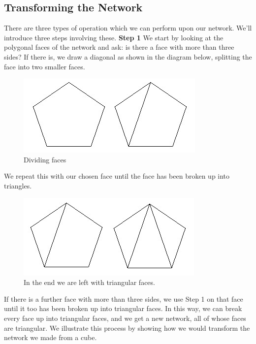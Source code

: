 
\subsection{Transforming the Network}
There are three types of operation which we can perform upon our network.
We’ll introduce three steps involving these.
\newpage
\noindent\textbf{Step 1} We start by looking at the polygonal faces of the network and ask: is there a face with more than three sides? If there is, we draw a diagonal as
shown in the diagram below, splitting the face into two smaller faces.

\begin{figure}[h]
	\centering
	\includegraphics[width=0.8\linewidth]{images/dividing_faces}
	\caption{Dividing faces}
\end{figure}

We repeat this with our chosen face until the face has been broken up into
triangles.

\begin{figure}[h]
	\centering
	\includegraphics[width=0.8\linewidth]{images/triangular_faces}
	\caption{In the end we are left with triangular faces.}
\end{figure}

If there is a further face with more than three sides, we use Step 1 on that
face until it too has been broken up into triangular faces. In this way, we can
break every face up into triangular faces, and we get a new network, all of
whose faces are triangular. We illustrate this process by showing how we would
transform the network we made from a cube.

